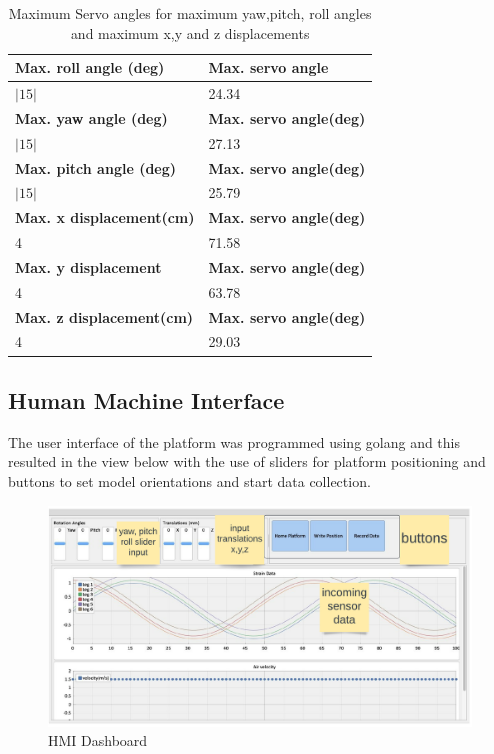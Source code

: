 \begin{center}
	\begin{table}[H]
	\centering
	\caption[Maximum Servo angles]{Maximum Servo angles for maximum yaw,pitch, roll angles and maximum x,y and z displacements}
	\label{roll}
	\centering
	\begin{tabular}{|l|l|}
	\hline
	\textbf{Max. roll angle (deg)}& \textbf{Max. servo angle} \\
	\hline
	 $|15|$& 24.34\\
	 \hline
\textbf{Max. yaw angle (deg)}& \textbf{Max. servo angle(deg)}\\
	\hline
	$|15|$& 27.13\\
	\hline
	\textbf{Max. pitch angle (deg)}& \textbf{Max. servo angle(deg)}\\
	\hline
	$|15|$& 25.79 \\
	\hline
	\textbf{Max. x displacement(cm)} & \textbf{Max. servo angle(deg)}\\
	\hline
	4 & 71.58 \\
	\hline
	\textbf{Max. y displacement} & \textbf{Max. servo angle(deg)}\\
	\hline
	4	& 63.78\\
	\hline
	\textbf{Max. z displacement(cm)} & \textbf{Max. servo angle(deg)}\\
	\hline
	4	& 29.03\\
	\hline
	\end{tabular}
\end{table}
\end{center}

\subsection{Human Machine Interface}
The user interface of the platform was programmed using golang and this resulted in the view below with the use of sliders for platform positioning and buttons to set model orientations and start data collection.
\begin{center}
	\begin{figure}[H]
	\centering
	\includegraphics[width=1\linewidth]{Figures/hmi}
	\caption[HMI Dashboard]{HMI Dashboard}
	\end{figure}
\end{center}

